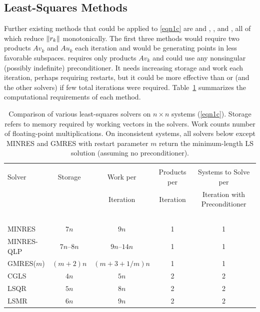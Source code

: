 \documentclass{doc_acmtrans2m}
\begin{document}
\subsection{Least-Squares Methods}

Further existing methods that could be applied to \eqref{eqn1c} are
\CGLS and \LSQR \cite{PS82a,PS82b}, \LSMR \cite{FS11}, and \GMRES
\cite{SS86}, all of which reduce $\norm{r_k}$ monotonically.  The
first three methods would require two products $A v_k$ and $A u_k$
each iteration and would be generating points in less favorable
subspaces. \GMRES requires only products $A v_k$ and could use any
nonsingular (possibly indefinite) preconditioner.  It needs increasing
storage and work each iteration, perhaps requiring restarts, but it
could be more effective than \MINRES or \MINRESQLP (and the other
solvers) if few total iterations were required.
Table~\ref{table-algo-work} summarizes the computational requirements
of each method.


\begin{table}%
\vspace{-2ex}
\caption{Comparison of various least-squares solvers on $n \times n$
  systems (\ref{eqn1c}).  Storage refers to memory required by working
  vectors in the solvers. Work counts number of floating-point
  multiplications.  On inconsistent systems, all solvers below except
  MINRES and GMRES with restart parameter $m$ return the
  minimum-length LS solution (assuming no preconditioner).}
\label{table-algo-work}
\vspace{-1ex}
\begin{center}
  \begin{tabular}{|l|c|c|c|c|}
    \hline
  \\[-10pt]
    Solver      & Storage  & Work per   & Products per  & Systems to Solve per 
  \\[-1pt]      &          & Iteration  &  Iteration    & Iteration with Preconditioner
  \\ \hline $ $ &          &   %
  \\[-9.5pt]
     MINRES     & $7n$     & $9n$       & 1 &  1
  \\ MINRES-QLP &$7n$--$8n$& $9n$--$14n$& 1 &  1
  \\ GMRES($m$) & $(m+2)n$ & $(m+3+1/m)n$ & 1 &  1
  \\ CGLS       & $4n$     & $5n$       & 2 &  2
  \\ LSQR       & $5n$     & $8n$       & 2 &  2
  \\ LSMR       & $6n$     & $9n$       & 2 &  2
  \\ \hline
  \end{tabular}
\end{center}
\end{table}
\end{document}
